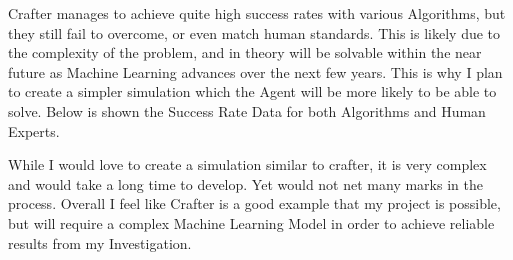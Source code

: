 \begin{flushleft}
                            Crafter manages to achieve quite high success rates with various Algorithms, but they still fail to overcome, or even match
                            human standards. This is likely due to the complexity of the problem, and in theory will be solvable within the near future
                            as Machine Learning advances over the next few years. This is why I plan to create a simpler simulation which the Agent will
                            be more likely to be able to solve. Below is shown the Success Rate Data for both Algorithms and Human Experts. \\

                            \begin{figure}[h]
                                \centering
                                \qquad
                            \end{figure}

                            While I would love to create a simulation similar to crafter, it is very complex and would take a long time to develop. Yet
                            would not net many marks in the process. Overall I feel like Crafter is a good example that my project is possible, but will
                            require a complex Machine Learning Model in order to achieve reliable results from my Investigation.


\end{flushleft}
